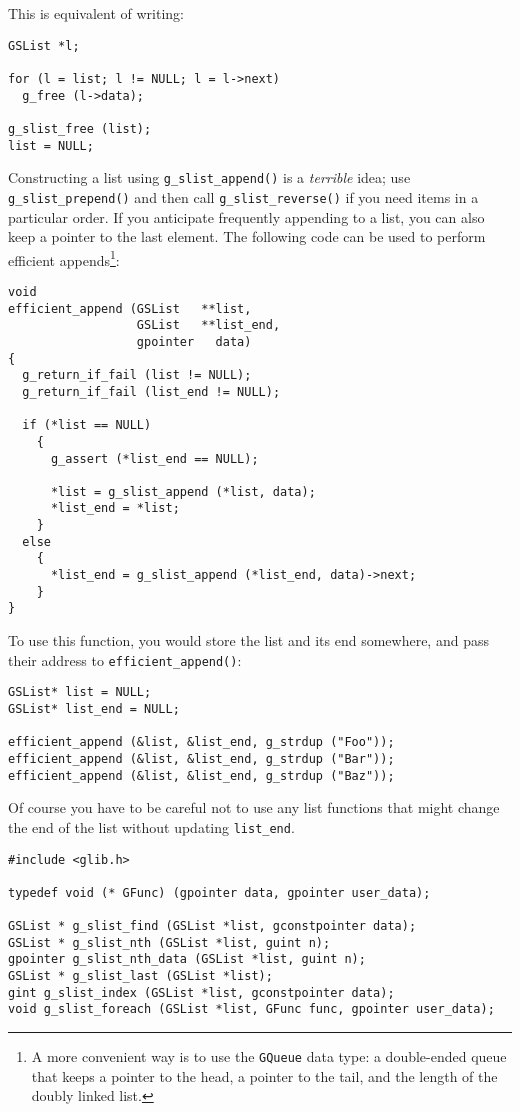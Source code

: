 This is equivalent of writing:
\begin{lstlisting}
GSList *l;

for (l = list; l != NULL; l = l->next)
  g_free (l->data);

g_slist_free (list);
list = NULL;
\end{lstlisting}

Constructing a list using \lstinline{g_slist_append()} is a \emph{terrible} idea; use \lstinline{g_slist_prepend()} and then call \lstinline{g_slist_reverse()} if you need items in a particular order. If you anticipate frequently appending to a list, you can also keep a pointer to the last element. The following code can be used to perform efficient appends\footnote{A more convenient way is to use the \lstinline{GQueue} data type: a double-ended queue that keeps a pointer to the head, a pointer to the tail, and the length of the doubly linked list.}:

\begin{lstlisting}
void
efficient_append (GSList   **list,
                  GSList   **list_end,
                  gpointer   data)
{
  g_return_if_fail (list != NULL);
  g_return_if_fail (list_end != NULL);

  if (*list == NULL)
    {
      g_assert (*list_end == NULL);

      *list = g_slist_append (*list, data);
      *list_end = *list;
    }
  else
    {
      *list_end = g_slist_append (*list_end, data)->next;
    }
}
\end{lstlisting}

To use this function, you would store the list and its end somewhere, and pass their address to \lstinline{efficient_append()}:
\begin{lstlisting}
GSList* list = NULL;
GSList* list_end = NULL;

efficient_append (&list, &list_end, g_strdup ("Foo"));
efficient_append (&list, &list_end, g_strdup ("Bar"));
efficient_append (&list, &list_end, g_strdup ("Baz"));
\end{lstlisting}

Of course you have to be careful not to use any list functions that might change the end of the list without updating \lstinline{list_end}.

\begin{lstlisting}[float, caption={Accessing data in a linked list}, label=glib-listaccess]
#include <glib.h>

typedef void (* GFunc) (gpointer data, gpointer user_data);

GSList * g_slist_find (GSList *list, gconstpointer data);
GSList * g_slist_nth (GSList *list, guint n);
gpointer g_slist_nth_data (GSList *list, guint n);
GSList * g_slist_last (GSList *list);
gint g_slist_index (GSList *list, gconstpointer data);
void g_slist_foreach (GSList *list, GFunc func, gpointer user_data);
\end{lstlisting}

